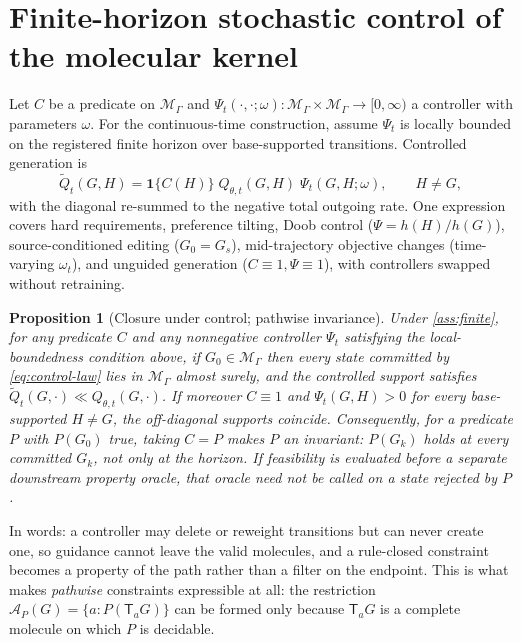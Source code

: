 \documentclass{article}
\newcommand{\M}{\mathcal{M}_{\Gamma}}
\newcommand{\A}{\mathcal{A}}
\newcommand{\T}{\mathsf{T}}
\newcommand{\one}{\mathbf{1}}
\newtheorem{proposition}[theorem]{Proposition}
\theoremstyle{definition}
\theoremstyle{remark}
\begin{document}
\section{Finite-horizon stochastic control of the molecular kernel}
\label{sec:control}

Let $C$ be a predicate on $\M$ and $\Psi_t(\cdot,\cdot;\omega):\M\times\M\to[0,\infty)$ a controller with parameters $\omega$. For the continuous-time construction, assume $\Psi_t$ is locally bounded on the registered finite horizon over base-supported transitions. Controlled generation is
\begin{equation}
\widetilde Q_t(G,H)=\one\{C(H)\}\;Q_{\theta,t}(G,H)\;\Psi_t(G,H;\omega),\qquad H\neq G,
\label{eq:control-law}
\end{equation}
with the diagonal re-summed to the negative total outgoing rate. One expression covers hard requirements, preference tilting, Doob control ($\Psi=h(H)/h(G)$), source-conditioned editing ($G_0=G_s$), mid-trajectory objective changes (time-varying $\omega_t$), and unguided generation ($C\equiv1,\Psi\equiv1$), with controllers swapped without retraining.

\begin{proposition}[Closure under control; pathwise invariance]\label{prop:control-closure}
Under \cref{ass:finite}, for any predicate $C$ and any nonnegative controller $\Psi_t$ satisfying the local-boundedness condition above, if $G_0\in\M$ then every state committed by \eqref{eq:control-law} lies in $\M$ almost surely, and the controlled support satisfies $\widetilde Q_t(G,\cdot)\ll Q_{\theta,t}(G,\cdot)$. If moreover $C\equiv1$ and $\Psi_t(G,H)>0$ for every base-supported $H\neq G$, the off-diagonal supports coincide. Consequently, for a predicate $P$ with $P(G_0)$ true, taking $C=P$ makes $P$ an invariant: $P(G_k)$ holds at \emph{every} committed $G_k$, not only at the horizon. If feasibility is evaluated before a separate downstream property oracle, that oracle need not be called on a state rejected by $P$.
\end{proposition}

In words: a controller may delete or reweight transitions but can never create one, so guidance cannot leave the valid molecules, and a rule-closed constraint becomes a property of the path rather than a filter on the endpoint. This is what makes \emph{pathwise} constraints expressible at all: the restriction $\A_P(G)=\{a:P(\T_aG)\}$ can be formed only because $\T_aG$ is a complete molecule on which $P$ is decidable.
\end{document}
